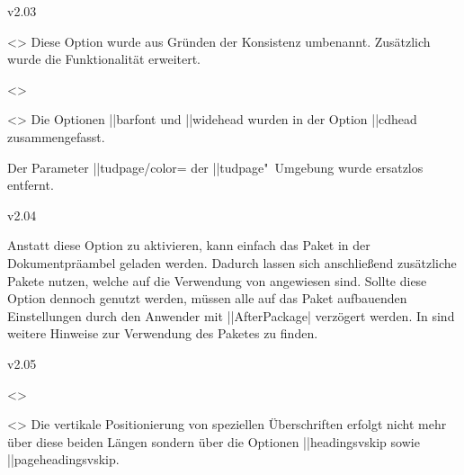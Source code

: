 \begin{Entity}{}
\begin{Changes}{v2.03}
\begin{Obsolete}
  {}
  <>
\printdeclarationlist
%
Diese Option wurde aus Gründen der Konsistenz umbenannt. Zusätzlich wurde die 
Funktionalität erweitert.
\end{Obsolete}

\begin{Obsolete}
  {}
  <>
\begin{Obsolete}
  {}
  <>
\printdeclarationlist
%
Die Optionen \Option||{barfont} und \Option||{widehead} wurden in der Option 
\Option||{cdhead} zusammengefasst.
\end{Obsolete}
\end{Obsolete}

\begin{Declaration*}
  {}
\begin{Obsolete}
  {}
\printdeclarationlist
%
Der Parameter \Environment||{tudpage/color=} der 
\Environment||{tudpage}"~Umgebung wurde ersatzlos entfernt.
\end{Obsolete}
\end{Declaration*}
\end{Changes}



\begin{Changes}{v2.04}
\begin{Obsolete}
  {}
\printdeclarationlist
%
Anstatt diese Option zu aktivieren, kann einfach das Paket  
in der Dokumentpräambel geladen werden. Dadurch lassen sich anschließend 
zusätzliche Pakete nutzen, welche auf die Verwendung von  
angewiesen sind. Sollte diese Option dennoch genutzt werden, müssen alle auf 
das Paket  aufbauenden Einstellungen durch den Anwender mit 
\Macro||{AfterPackage|\MPValue{\dots}} verzögert werden. In 
 sind weitere Hinweise zur Verwendung des Paketes 
 zu finden.
\end{Obsolete}
\end{Changes}



\begin{Changes}{v2.05}
\begin{Obsolete}
  {}
  <>
\begin{Obsolete}
  {}
  <>
\printdeclarationlist
%
Die vertikale Positionierung von speziellen Überschriften erfolgt nicht mehr 
über diese beiden Längen sondern über die Optionen \Option||{headingsvskip} 
sowie \Option||{pageheadingsvskip}.
\end{Obsolete}
\end{Obsolete}



\end{Changes}
\end{Entity}
